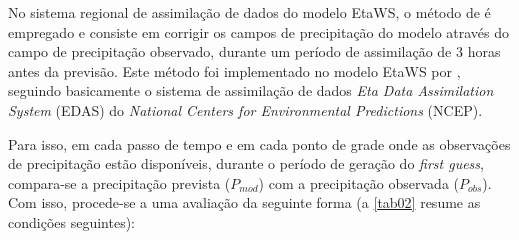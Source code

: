 No sistema regional de assimilação de dados do modelo EtaWS, o método de  é empregado e consiste em corrigir os campos de precipitação do modelo através do campo de precipitação observado, durante um período de assimilação de 3 horas antes da previsão. Este método foi implementado no modelo EtaWS por , seguindo basicamente o sistema de assimilação de dados \textit{Eta Data Assimilation System} (EDAS) do \textit{National Centers for Environmental Predictions} (NCEP).

Para isso, em cada passo de tempo e em cada ponto de grade onde as observações de precipitação estão disponíveis, durante o período de geração do \textit{first guess}, compara-se a precipitação prevista ($P_{mod}$) com a precipitação observada ($P_{obs}$). Com isso, procede-se a uma avaliação da seguinte forma (a \autoref{tab02} resume as condições seguintes):

